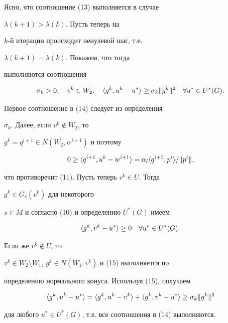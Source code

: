 \begin{pf}


Ясно, что соотношение (13) выполняется в случае


$\lambda(k+1)>\lambda(k)$. Пусть теперь на


$k$-й итерации происходит ненулевой шаг, т.е.


$\lambda(k+1)=\lambda(k)$. Покажем, что тогда


выполняются соотношения


\begin{equation}


\sigma_k>0,\quad v^k\in W_2,\quad


\la g^k,u^k-u^*\ra\ge \sigma_k\|g^k\|^2\quad


\forall u^*\in U^*(G).


\end{equation}


Первое соотношение в (14) следует из определения


$\sigma_k$. Далее, если $v^k\notin W_2$, то


$g^k=q^{i+1}\in N(W_2,w^{i+1})$ и поэтому


$$


0\ge \la q^{i+1},u^k-w^{i+1}\ra=\alpha_l\la q^{i+1},p^i\ra


/\|p^i\|,


$$


что противоречит (11). Пусть теперь $v^k\in U$. Тогда


$g^k\in G_s(v^k)$ для некоторого


$s\in M$ и согласно (10) и определению $U^*(G)$ имеем


\begin{equation}


\la g^k,v^k-u^*\ra\ge 0\quad \forall u^*\in U^*(G).


\end{equation}


Если же $v^k\notin U$, то


$v^k\in W_2\setminus W_1$, $g^k\in N(W_1,v^k)$ и (15) выполняется по


определению нормального конуса. Используя (15), получаем


$$


\la g^k,u^k-u^*\ra=\la g^k,u^k-v^k\ra+


\la g^k,v^k-u^*\ra\ge \sigma_k\|g^k\|^2


$$


для любого $u^*\in U^*(G)$, т.е. все соотношения в (14) выполняются.



\end{pf}
